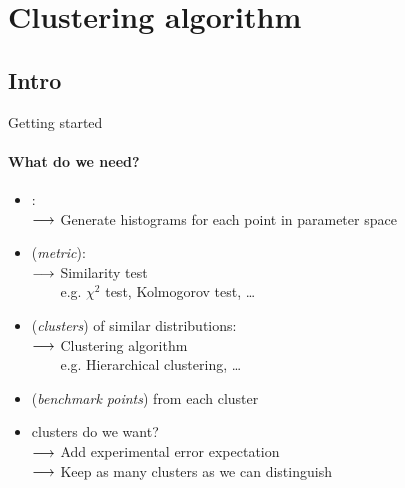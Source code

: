 \section{Clustering algorithm}
\subsection{Intro}
\begin{frame}[t]{Getting started}
    \framesubtitle{What do we need?}
	
    \begin{itemize}
   	\item<+->{
   		:\\
   		$\longrightarrow$ Generate histograms for each point in parameter space
   	}

    \item<+->{
    	\bigskip
         {\color{purple}(\emph{metric})}:\\
    	$\longrightarrow$ Similarity test\\
        $\phantom{\lra}$ {\small e.g. $\chi^2$ test, Kolmogorov test, \dots}
	}
    
    \item<+->{
    	\bigskip
    	 {\color{purple}(\emph{clusters})} of similar distributions:\\
    	$\longrightarrow$ Clustering algorithm\\
        $\phantom{\lra}$ {\small e.g. Hierarchical clustering, \dots}
    }
    
    \item<+->{
        \bigskip
         {\color{purple}(\emph{benchmark points})} from each cluster
    }
    
    \item<+->{
    	\bigskip
    	 clusters do we want?\\
    	$\longrightarrow$ Add experimental error expectation\\
    	$\longrightarrow$ Keep as many clusters as we can distinguish
    }
    \end{itemize}
\end{frame}
